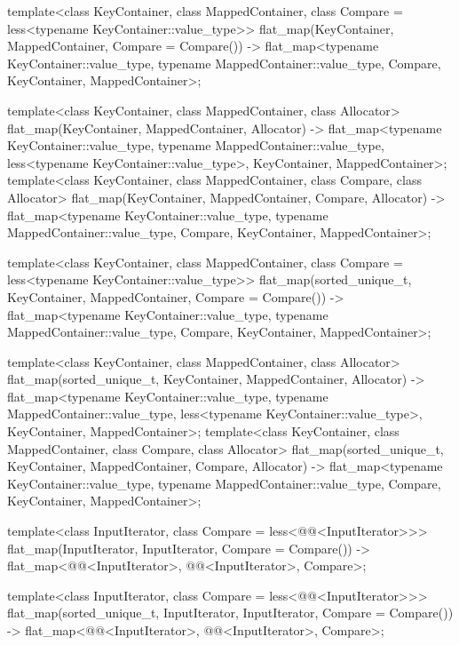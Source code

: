 \begin{codeblock}
{  template<class KeyContainer, class MappedContainer,
           class Compare = less<typename KeyContainer::value_type>>
    flat_map(KeyContainer, MappedContainer, Compare = Compare())
      -> flat_map<typename KeyContainer::value_type, typename MappedContainer::value_type,
                  Compare, KeyContainer, MappedContainer>;

  template<class KeyContainer, class MappedContainer, class Allocator>
    flat_map(KeyContainer, MappedContainer, Allocator)
      -> flat_map<typename KeyContainer::value_type, typename MappedContainer::value_type,
                  less<typename KeyContainer::value_type>, KeyContainer, MappedContainer>;
  template<class KeyContainer, class MappedContainer, class Compare, class Allocator>
    flat_map(KeyContainer, MappedContainer, Compare, Allocator)
      -> flat_map<typename KeyContainer::value_type, typename MappedContainer::value_type,
                  Compare, KeyContainer, MappedContainer>;

  template<class KeyContainer, class MappedContainer,
           class Compare = less<typename KeyContainer::value_type>>
    flat_map(sorted_unique_t, KeyContainer, MappedContainer, Compare = Compare())
      -> flat_map<typename KeyContainer::value_type, typename MappedContainer::value_type,
                  Compare, KeyContainer, MappedContainer>;

  template<class KeyContainer, class MappedContainer, class Allocator>
    flat_map(sorted_unique_t, KeyContainer, MappedContainer, Allocator)
      -> flat_map<typename KeyContainer::value_type, typename MappedContainer::value_type,
                  less<typename KeyContainer::value_type>, KeyContainer, MappedContainer>;
  template<class KeyContainer, class MappedContainer, class Compare, class Allocator>
    flat_map(sorted_unique_t, KeyContainer, MappedContainer, Compare, Allocator)
      -> flat_map<typename KeyContainer::value_type, typename MappedContainer::value_type,
                  Compare, KeyContainer, MappedContainer>;

  template<class InputIterator, class Compare = less<@@<InputIterator>>>
    flat_map(InputIterator, InputIterator, Compare = Compare())
      -> flat_map<@@<InputIterator>, @@<InputIterator>, Compare>;

  template<class InputIterator, class Compare = less<@@<InputIterator>>>
    flat_map(sorted_unique_t, InputIterator, InputIterator, Compare = Compare())
      -> flat_map<@@<InputIterator>, @@<InputIterator>, Compare>;

}
\end{codeblock}
